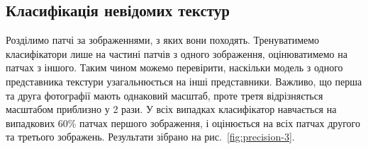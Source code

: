 \newpage
\subsection{Класифікація невідомих текстур}\label{section2.1e}\hfill

Розділимо патчі за зображеннями, з яких вони походять.
Тренуватимемо класифікатори лише на частині патчів з одного зображення, оцінюватимемо на патчах з іншого.
Таким чином можемо перевірити, наскільки модель з одного представника текстури узагальнюється на інші представники.  
Важливо, що перша та друга фотографії мають однаковий масштаб, проте третя відрізняється масштабом приблизно у 2 рази.
У всіх випадках класифікатор навчається на випадкових 60\% патчах першого зображення, і оцінюється на всіх патчах другого та третього зображень.
Результати зібрано на рис.~\ref{fig:precision-3}.

